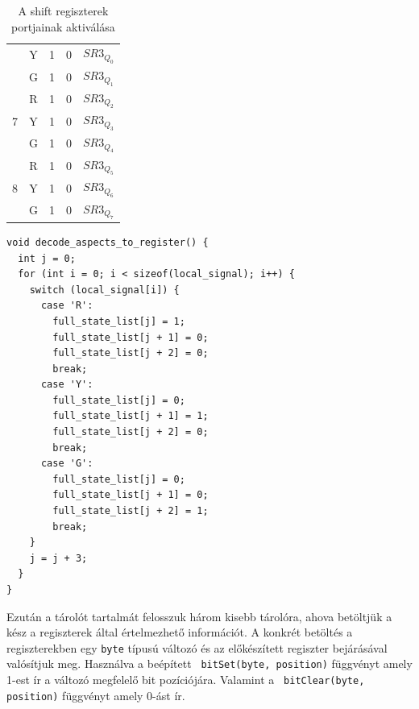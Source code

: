 \documentclass[a4paper,12pt]{article}
\begin{document}
\begin{table}[htp]
\begin{tabular}{|c|c|c|c|c|}
                   & Y        & 1     & 0       &\cellcolor{blue!25} $SR3_{Q_{0}}$  \\ \cline{2-5} 
                   & G        & 1     & 0       &\cellcolor{blue!25} $SR3_{Q_{1}}$  \\ \hline
\multirow{3}{*}{7} & R        & 1     & 0       &\cellcolor{blue!25} $SR3_{Q_{2}}$  \\ \cline{2-5} 
                   & Y        & 1     & 0       &\cellcolor{blue!25} $SR3_{Q_{3}}$  \\ \cline{2-5} 
                   & G        & 1     & 0       &\cellcolor{blue!25} $SR3_{Q_{4}}$  \\ \hline
\multirow{3}{*}{8} & R        & 1     & 0       &\cellcolor{blue!25} $SR3_{Q_{5}}$  \\ \cline{2-5} 
                   & Y        & 1     & 0       &\cellcolor{blue!25} $SR3_{Q_{6}}$  \\ \cline{2-5} 
                   & G        & 1     & 0       &\cellcolor{blue!25} $SR3_{Q_{7}}$  \\ \hline
\end{tabular}
    \caption[Regiszter kódolás]{A shift regiszterek portjainak aktiválása}
    \label{tab:registercoding}
\end{table}

\begin{minipage}{\linewidth}
\begin{lstlisting}[style=CStyle, caption={Aspektus információ dekódolása a regiszterek számára},label=code:sm_decode_asp]
void decode_aspects_to_register() {
  int j = 0;
  for (int i = 0; i < sizeof(local_signal); i++) {
    switch (local_signal[i]) {
      case 'R':
        full_state_list[j] = 1;
        full_state_list[j + 1] = 0;
        full_state_list[j + 2] = 0;
        break;
      case 'Y':
        full_state_list[j] = 0;
        full_state_list[j + 1] = 1;
        full_state_list[j + 2] = 0;
        break;
      case 'G':
        full_state_list[j] = 0;
        full_state_list[j + 1] = 0;
        full_state_list[j + 2] = 1;
        break;
    }
    j = j + 3;
  }
}
\end{lstlisting}
\end{minipage}

Ezután a tárolót tartalmát felosszuk három kisebb tárolóra, ahova betöltjük a kész a regiszterek által értelmezhető információt.
A konkrét betöltés a regiszterekben egy \texttt{byte} típusú változó és az előkészített regiszter bejárásával valósítjuk meg.
Használva a beépített \texttt{ bitSet(byte, position)} függvényt amely 1-est ír a változó megfelelő bit pozíciójára.
Valamint a  \texttt{ bitClear(byte, position)} függvényt amely 0-ást ír.
\end{document}
